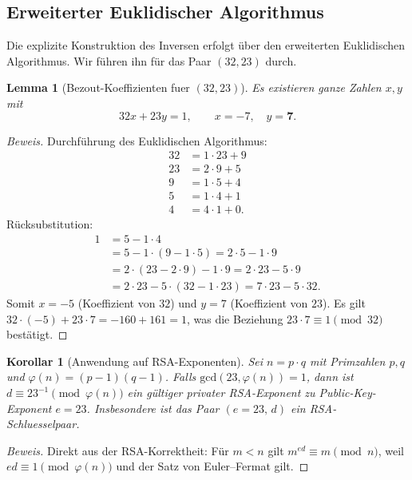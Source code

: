 ﻿\documentclass[12pt, a4paper]{article}
\theoremstyle{plain}
\newtheorem{lemma}[theorem]{Lemma}
\newtheorem{corollary}[theorem]{Korollar}
\theoremstyle{definition}
\theoremstyle{remark}
\newenvironment{myproof}[1][Beweis]{%
  \begin{proof}[#1]
}{%
  \end{proof}
}
\newcommand{\GCD}{\mathrm{gcd}}
\begin{document}
\subsection{Erweiterter Euklidischer Algorithmus}

Die explizite Konstruktion des Inversen erfolgt \"uber den erweiterten
Euklidischen Algorithmus. Wir f\"uhren ihn f\"ur das Paar $(32, 23)$ durch.

\begin{lemma}[Bezout-Koeffizienten fuer $(32, 23)$]\label{lem:bezout}
  Es existieren ganze Zahlen $x, y$ mit
  \[
    32 x + 23 y = 1, \qquad x = -7,\quad y = \mathbf{7}.
  \]
\end{lemma}

\begin{myproof}
  Durchf\"uhrung des Euklidischen Algorithmus:
  \begin{align*}
    32 &= 1 \cdot 23 + 9\\
    23 &= 2 \cdot 9 + 5\\
    9  &= 1 \cdot 5 + 4\\
    5  &= 1 \cdot 4 + 1\\
    4  &= 4 \cdot 1 + 0.
  \end{align*}
  R\"ucksubstitution:
  \begin{align*}
    1 &= 5 - 1\cdot 4\\
      &= 5 - 1\cdot(9-1\cdot5) = 2\cdot5 - 1\cdot9\\
      &= 2\cdot(23-2\cdot9) - 1\cdot9 = 2\cdot23 - 5\cdot9\\
      &= 2\cdot23 - 5\cdot(32-1\cdot23) = 7\cdot23 - 5\cdot32.
  \end{align*}
  Somit $x = -5$ (Koeffizient von $32$) und $y = 7$ (Koeffizient von $23$).
  Es gilt $32\cdot(-5) + 23\cdot 7 = -160 + 161 = 1$, was die Beziehung
  $23 \cdot 7 \equiv 1 \pmod{32}$ best\"atigt. 
\end{myproof}

\begin{corollary}[Anwendung auf RSA-Exponenten]\label{cor:rsa_exp}
  Sei $n = p \cdot q$ mit Primzahlen $p,q$ und $\varphi(n)=(p-1)(q-1)$.
  Falls $\GCD(23, \varphi(n)) = 1$, dann ist $d \equiv 23^{-1} \pmod{\varphi(n)}$
  ein g\"ultiger privater RSA-Exponent zu Public-Key-Exponent $e = 23$.
  Insbesondere ist das Paar $(e=23,\,d)$ ein RSA-Schluesselpaar.
\end{corollary}

\begin{myproof}
  Direkt aus der RSA-Korrektheit: F\"ur $m < n$ gilt
  $m^{ed} \equiv m \pmod{n}$, weil $ed \equiv 1 \pmod{\varphi(n)}$
  und der Satz von Euler--Fermat gilt.
\end{myproof}
\end{document}
